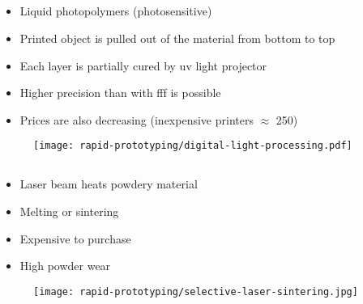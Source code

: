 \documentclass[aspectratio=169]{beamer}
\begin{document}
\subsection{}
\begin{frame}
    \begin{itemize}
        \item Liquid photopolymers (photosensitive)
        \item Printed object is pulled out of the material from bottom to top
        \item Each layer is partially cured by \acs{uv} light projector
        \item Higher precision than with \acs{fff} is possible
        \item Prices are also decreasing (inexpensive printers $\approx$ \SI{250}{\sieuro})
    \end{itemize}
\end{frame}

\begin{frame}
    \begin{figure}
        \texttt{[image: rapid-prototyping/digital-light-processing.pdf]}
        \caption{}
    \end{figure}
\end{frame}

\subsection{}

\begin{frame}
    \begin{itemize}
        \item Laser beam heats powdery material
        \item Melting or sintering
        \item Expensive to purchase
        \item High powder wear
    \end{itemize}
    \begin{figure}
        \texttt{[image: rapid-prototyping/selective-laser-sintering.jpg]}
        \caption{}
    \end{figure}
\end{frame}
\end{document}
